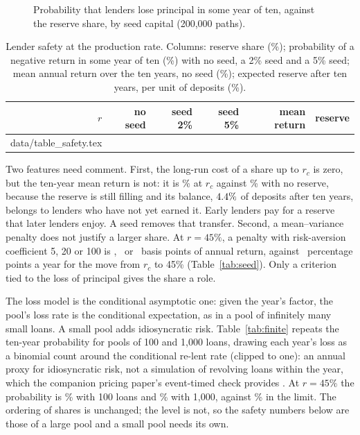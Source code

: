 \documentclass[preprint,11pt,authoryear]{elsarticle}
\makeatletter
\theoremstyle{definition}
\newcommand{\inputrows}[1]{\@@input #1 }
\makeatother
\begin{document}
\begin{figure}[ht]
  \centering
  
  \caption{Probability that lenders lose principal in some year of ten, against the reserve share, by seed capital
  (200,000 paths).}
  \label{fig:safety}
\end{figure}

\begin{table}[ht]
  \centering\small
  \caption{Lender safety at the production rate. Columns: reserve share (\%); probability of a negative return in some
  year of ten (\%) with no seed, a 2\% seed and a 5\% seed; mean annual return over the ten years, no seed (\%);
  expected reserve after ten years, per unit of deposits (\%).}
  \label{tab:safety}
  \begin{tabular}{rrrrrr}
    \toprule
    $r$ & no seed & seed 2\% & seed 5\% & mean return & reserve \\
    \midrule
    \inputrows{data/table_safety.tex}
    \bottomrule
  \end{tabular}
\end{table}

Two features need comment. First, the long-run cost of a share up to $r_c$ is zero, but the ten-year mean return is not: it is
\MeanRC\% at $r_c$ against \MeanZero\% with no reserve, because the reserve is still filling and its balance, $4.4\%$ of
deposits after ten years, belongs to lenders who have not yet earned it. Early lenders pay for a reserve that later lenders enjoy. A seed
removes that transfer. Second, a mean--variance penalty does not justify a larger share. At $r=45\%$, a penalty with risk-aversion
coefficient 5, 20 or 100 is \MVPenFive, \MVPenTwenty\ or \MVPenHundred\ basis points of annual return, against \ShareCostFortyFive\ percentage points a year for
the move from $r_c$ to 45\% (Table~\ref{tab:seed}). Only a criterion tied to the loss of principal gives the share a role.

The loss model is the conditional asymptotic one: given the year's factor, the pool's loss rate is the conditional
expectation, as in a pool of infinitely many small loans. A small pool adds idiosyncratic risk. Table~\ref{tab:finite}
repeats the ten-year probability for pools of 100 and 1,000 loans, drawing each year's loss as a binomial count around
the conditional re-lent rate (clipped to one): an annual proxy for idiosyncratic risk, not a simulation of revolving
loans within the year, which the companion pricing paper's event-timed check provides
\citep{pricingreserve2026}. At $r=45\%$ the probability is \PTenFortyFivePoolHundred\% with 100 loans and
\PTenFortyFivePoolThousand\% with 1,000, against \PTenAtFortyFive\% in the limit. The ordering of shares is unchanged;
the level is not, so the safety numbers below are those of a large pool and a small pool needs its own.
\end{document}

